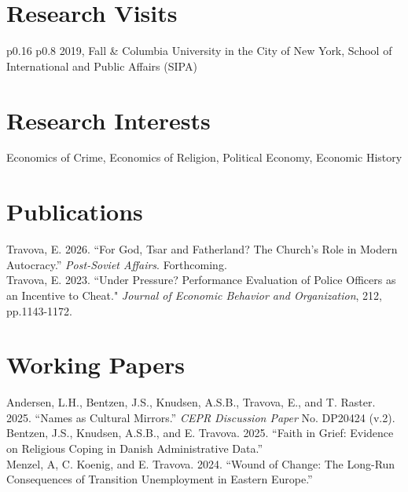 \documentclass[letterpaper]{article}
\begin{document}
\vspace{+0.1cm}
\section*{Research Visits}
\vspace{-0.5cm}
\noindent {\color{grey} \rule{\linewidth}{0.1mm}}
\begin{tabular}{ p{0.16\textwidth} p{0.8\textwidth}  }
 2019, Fall & Columbia University in the City of New York, School of International and Public Affairs (SIPA)
\end{tabular}

\vspace{+0.1cm}
\section*{Research Interests}
\vspace{-0.5cm}
\noindent {\color{grey} \rule{\linewidth}{0.1mm}}
\raggedright
Economics of Crime, Economics of Religion, Political Economy, Economic History %

\vspace{+0.1cm}
\section*{Publications}
\vspace{-0.5cm}
\noindent {\color{grey} \rule{\linewidth}{0.1mm}}
Travova, E. 2026. ``For God, Tsar and Fatherland? The Church's Role in Modern Autocracy.'' \textit{Post-Soviet Affairs}. Forthcoming.\\
\medskip
Travova, E. 2023. ``Under Pressure? Performance Evaluation of Police Officers as an Incentive to Cheat." \textit{Journal of Economic Behavior and Organization}, 212, pp.1143-1172.\\

\vspace{+0.1cm}
\section*{Working Papers}
\vspace{-0.5cm}
\noindent {\color{grey} \rule{\linewidth}{0.1mm}}
Andersen, L.H., Bentzen, J.S., Knudsen, A.S.B., Travova, E., and T. Raster. 2025. ``Names as Cultural Mirrors.'' \textit{CEPR Discussion Paper} No. DP20424 (v.2). \\ 
\medskip
Bentzen, J.S., Knudsen, A.S.B., and E. Travova. 2025. ``Faith in Grief: Evidence on Religious Coping in Danish Administrative Data.''\\ 
\medskip
Menzel, A, C. Koenig, and E. Travova. 2024. ``Wound of Change: The Long-Run Consequences of Transition Unemployment in Eastern Europe.''\\
\end{document}
